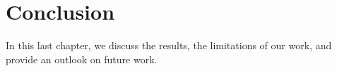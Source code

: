 \chapter{Conclusion}
\label{cap:conclusion}


In this last chapter, we discuss the results, the limitations of our work, and provide an outlook on future work. 

